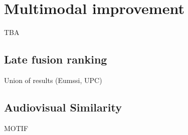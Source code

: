 \section{Multimodal improvement}
\label{sec:naming}

TBA

\subsection{Late fusion ranking}

Union of results (Eumssi, UPC)

\subsection{Audiovisual Similarity}

MOTIF

\endinput
